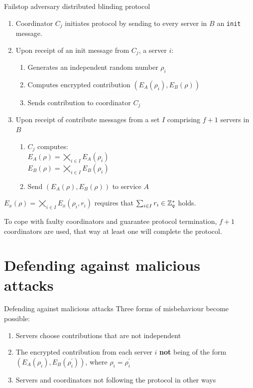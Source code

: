 \documentclass[10pt]{beamer}
\begin{document}
\begin{frame}[allowframebreaks]{Failstop adversary distributed blinding protocol}
  \begin{enumerate}
  \item Coordinator $C_j$ initiates protocol by sending to every server in $B$ an \texttt{init} message.
  \item Upon receipt of an init message from $C_j$, a server $i$:
    \begin{enumerate}
    \item Generates an independent random number $\rho_i$
    \item Computes encrypted contribution $(E_A(\rho_i), E_B(\rho))$
    \item Sends contribution to coordinator $C_j$
    \end{enumerate}

  \item Upon receipt of contribute messages from a set $I$ comprising $f+1$ servers in $B$
    \begin{enumerate}
    \item $C_j$ computes: \\
      $E_A(\rho) = \bigtimes_{i\in I} E_A(\rho_i)$ \\
      $E_B(\rho) = \bigtimes_{i\in I} E_B(\rho_i)$
      \item Send $(E_A(\rho), E_B(\rho))$ to service $A$
    \end{enumerate}
  \end{enumerate}

  $E_x(\rho) = \bigtimes_{i\in I} E_x(\rho_i, r_i)$ requires that $\sum_{i\in I} r_i  \in \mathbb{Z}_q^{\ast}$ holds.
  
  \framebreak

  To cope with faulty coordinators and guarantee protocol termination, $f+1$ coordinators are used, that way at least one will complete the protocol.
\end{frame}


\section{Defending against malicious attacks}

\begin{frame}{Defending against malicious attacks}
  Three forms of misbehaviour become possible:
  \begin{enumerate}
  \item Servers choose contributions that are not independent
  \item The encrypted contribution from each server $i$ \textbf{not} being of the form $(E_A(\rho_i), E_B(\rho^{\prime}_i))$, where $\rho_i = \rho^{\prime}_i$
  \item Servers and coordinators not following the protocol in other ways
  \end{enumerate}
\end{frame}
\end{document}
